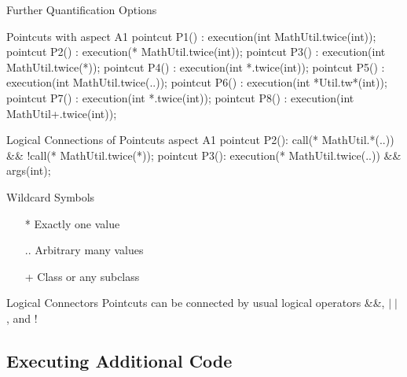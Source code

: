 \begin{frame}[fragile]{Further Quantification Options}
	\begin{fancycolumns}[widths={70},animation=none]
\begin{codetight}{Pointcuts with }
aspect A1 {
	pointcut P1() : execution(int MathUtil.twice(int));
	pointcut P2() : execution(* MathUtil.twice(int));
	pointcut P3() : execution(int MathUtil.twice(*));
	pointcut P4() : execution(int *.twice(int));
	pointcut P5() : execution(int MathUtil.twice(..));
	pointcut P6() : execution(int *Util.tw*(int));
	pointcut P7() : execution(int *.twice(int));
	pointcut P8() : execution(int MathUtil+.twice(int));
}
\end{codetight}
\begin{codetight}{Logical Connections of Pointcuts}
aspect A1 {
	pointcut P2(): call(* MathUtil.*(..)) && !call(* MathUtil.twice(*));
	pointcut P3(): execution(* MathUtil.twice(..)) && args(int);
}
\end{codetight}
	\nextcolumn
		\begin{note}{Wildcard Symbols}
			\begin{itemize}
				\item [*] Exactly one value
				\item [..] Arbitrary many values
				\item [+] Class or any subclass
			\end{itemize}
		\end{note}
		\begin{note}{Logical Connectors}
			Pointcuts can be connected by usual logical operators \&\&, $\mid\mid$, and !
		\end{note}
	\end{fancycolumns}
\end{frame}

\subsection{Executing Additional Code}

